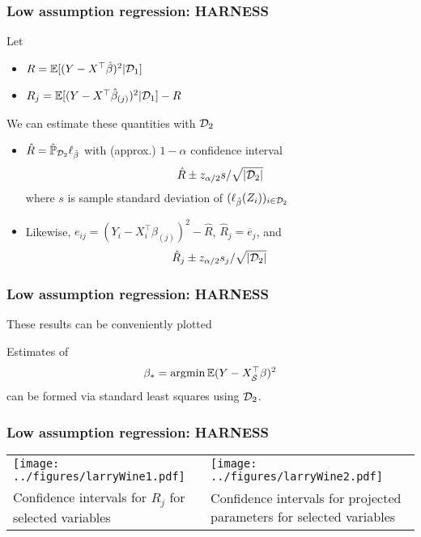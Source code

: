 \documentclass[12pt]{beamer}
\begin{document}
  \begin{frame}
  \frametitle{Low assumption regression: HARNESS}
Let 
\begin{itemize}
\item $R = \mathbb{E}[(Y - X^{\top}\hat\beta)^2|\mathcal{D}_1]$
\item $R_j = \mathbb{E}[(Y - X^{\top}\hat\beta_{(j)})^2|\mathcal{D}_1] - R$

\end{itemize}
\vsp

We can estimate these quantities with $\mathcal{D}_2$
\begin{itemize}
\item $\hat{R} = \hat{\mathbb{P}}_{\mathcal{D}_2} \ell_{\hat\beta}$ with (approx.) $1-\alpha$ confidence interval
\[
\hat{R} \pm z_{\alpha/2} s / \sqrt{|\mathcal{D}_2|}
\]
where $s$ is sample standard deviation of $(\ell_{\hat\beta}(Z_i))_{i \in \mathcal{D}_2}$
\item Likewise, $e_{ij} = (Y_i - X_i^{\top}\hat\beta_{(j)})^2 - \hat{R}$, $\hat{R}_j = \overline{e}_j$, and
\[
\hat{R}_j \pm z_{\alpha/2} s_j / \sqrt{|\mathcal{D}_2|}
\]

\end{itemize}
\end{frame}

  \begin{frame}
  \frametitle{Low assumption regression: HARNESS}
These results can be conveniently plotted

\vsp

Estimates of 
\[
\beta_* = \operatorname*{\arg\!\min} \mathbb{E}(Y - X_{\hat{\mathcal{S}}}^{\top}\beta)^2
\]
can be formed via standard least squares using $\mathcal{D}_2$.
\end{frame}

  \begin{frame}
  \frametitle{Low assumption regression: HARNESS}
\begin{table}
\centering
\begin{tabular}{p{5.5cm}p{5.5cm}}
\texttt{[image: ../figures/larryWine1.pdf]} &
\texttt{[image: ../figures/larryWine2.pdf]} \\
Confidence intervals for $R_j$ for selected variables & 
Confidence intervals for projected parameters for selected variables 
\end{tabular}
\end{table}
\end{frame}
\end{document}
